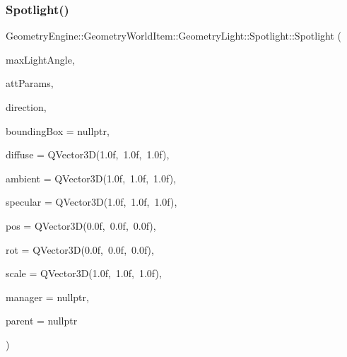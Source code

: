 \subsubsection{\texorpdfstring{Spotlight()}{Spotlight()}\hspace{0.1cm}{\footnotesize\ttfamily [1/2]}}
{\footnotesize\ttfamily Geometry\+Engine\+::\+Geometry\+World\+Item\+::\+Geometry\+Light\+::\+Spotlight\+::\+Spotlight (\begin{DoxyParamCaption}\item[{float}]{max\+Light\+Angle,  }\item[{const Q\+Vector3D \&}]{att\+Params,  }\item[{const Q\+Vector3D \&}]{direction,  }\item[{\mbox{\hyperlink{class_geometry_engine_1_1_geometry_world_item_1_1_geometry_item_1_1_geometry_item}{Geometry\+Item\+::\+Geometry\+Item}} $\ast$}]{bounding\+Box = {\ttfamily nullptr},  }\item[{const Q\+Vector3D \&}]{diffuse = {\ttfamily QVector3D(1.0f,~1.0f,~1.0f)},  }\item[{const Q\+Vector3D \&}]{ambient = {\ttfamily QVector3D(1.0f,~1.0f,~1.0f)},  }\item[{const Q\+Vector3D \&}]{specular = {\ttfamily QVector3D(1.0f,~1.0f,~1.0f)},  }\item[{const Q\+Vector3D \&}]{pos = {\ttfamily QVector3D(0.0f,~0.0f,~0.0f)},  }\item[{const Q\+Vector3D \&}]{rot = {\ttfamily QVector3D(0.0f,~0.0f,~0.0f)},  }\item[{const Q\+Vector3D \&}]{scale = {\ttfamily QVector3D(1.0f,~1.0f,~1.0f)},  }\item[{const \mbox{\hyperlink{class_geometry_engine_1_1_light_utils_1_1_light_component_manager}{Light\+Utils\+::\+Light\+Component\+Manager}} $\ast$const}]{manager = {\ttfamily nullptr},  }\item[{\mbox{\hyperlink{class_geometry_engine_1_1_geometry_world_item_1_1_world_item}{World\+Item}} $\ast$}]{parent = {\ttfamily nullptr} }\end{DoxyParamCaption})}

